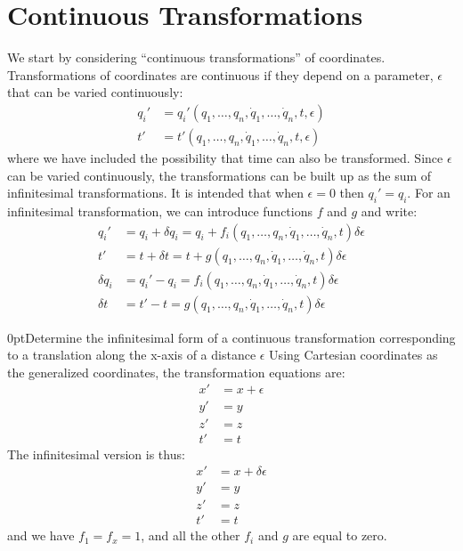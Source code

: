 \section{Continuous Transformations}
We start by considering ``continuous transformations'' of coordinates. Transformations of coordinates are continuous if they depend on a parameter, $\epsilon$ that can be varied continuously:
\begin{align}
q_i'&=q_i'(q_1,\dots ,q_n,\dot{q}_1,\dots ,\dot{q}_n, t, \epsilon)\nonumber\\
t'&=t'(q_1,\dots ,q_n,\dot{q}_1,\dots ,\dot{q}_n, t, \epsilon)
\end{align}
where we have included the possibility that time can also be transformed. Since $\epsilon$ can be varied continuously, the transformations can be built up as the sum of infinitesimal transformations. It is intended that when $\epsilon=0$ then $q_i'=q_i$. For an infinitesimal transformation, we can introduce functions $f$ and $g$ and write:
\begin{align}
q_i'&=q_i+\delta q_i=q_i+f_i(q_1,\dots ,q_n,\dot{q}_1,\dots ,\dot{q}_n, t)\delta\epsilon\nonumber\\
t'&=t+\delta t=t+g(q_1,\dots ,q_n,\dot{q}_1,\dots ,\dot{q}_n, t)\delta\epsilon\nonumber\\
\delta q_i&=q_i'-q_i=f_i(q_1,\dots ,q_n,\dot{q}_1,\dots ,\dot{q}_n, t)\delta\epsilon\nonumber\\
\delta t&=t'-t=g(q_1,\dots ,q_n,\dot{q}_1,\dots ,\dot{q}_n, t)\delta\epsilon
\end{align}
\begin{example}{0pt}{Determine the infinitesimal form of a continuous transformation corresponding to a translation along the x-axis of a distance $\epsilon$}{}
Using Cartesian coordinates as the generalized coordinates, the transformation equations are:
\begin{align*}
x'&=x+\epsilon\\
y'&=y\\
z'&=z\\
t'&=t
\end{align*}
The infinitesimal version is thus:
\begin{align*}
x'&=x+\delta\epsilon\\
y'&=y\\
z'&=z\\
t'&=t
\end{align*}
and we have $f_1=f_x=1$, and all the other $f_i$ and $g$ are equal to zero.
\end{example}

